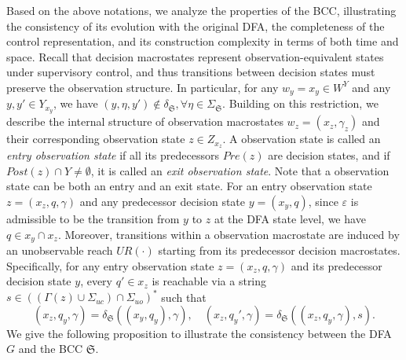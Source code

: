 \documentclass[final,5p,times,twocolumn,authoryear]{elsarticle}
\begin{document}
Based on the above notations, we analyze the properties of the BCC, illustrating the consistency of its evolution with the original DFA, the completeness of the control representation, and its construction complexity in terms of both time and space.
%
Recall that decision macrostates represent observation-equivalent states under supervisory control, and thus transitions between decision states must preserve the observation structure. In particular, for any $w_y = x_y \in W^Y$ and any $y, y' \in Y_{x_y}$, we have
$
(y, \eta, y') \notin \delta_{\mathfrak{S}}, \forall \eta \in \Sigma_{\mathfrak{S}}.
$
%
Building on this restriction, we describe the internal structure of observation macrostates $w_z = (x_z, \gamma_z)$ and their corresponding observation state $z \in Z_{x_z}$.
A observation state is called an \emph{entry observation state} if all its predecessors $Pre(z)$ are decision states, and if $Post(z) \cap Y \neq \emptyset$, it is called an \emph{exit observation state}. 
Note that a observation state can be both an entry and an exit state.
%
For an entry observation state $z = (x_z, q, \gamma)$ and any predecessor decision state $y = (x_y, q)$, since $\varepsilon$ is admissible to be the transition from $y$ to $z$ at the DFA state level, we have $q \in x_y \cap x_z$.
%
Moreover, transitions within a observation macrostate are induced by an unobservable reach $UR(\cdot)$ starting from its predecessor decision macrostates.
%
Specifically, for any entry observation state $z = (x_z, q, \gamma)$ and its predecessor decision state $y$, every $q' \in x_z$ is reachable via a string 
$
s \in ((\Gamma(z)\cup\Sigma_{uc})\cap\Sigma_{uo})^*
$ 
such that
$$
(x_z, q_y, \gamma) = \delta_{\mathfrak{S}}((x_y, q_y), \gamma),
\quad
(x_z, q_y', \gamma) = \delta_{\mathfrak{S}}((x_z, q_y, \gamma), s).
$$
%
We give the following proposition to illustrate the consistency between the DFA $G$ and the BCC $\mathfrak{S}$.
%
\end{document}
